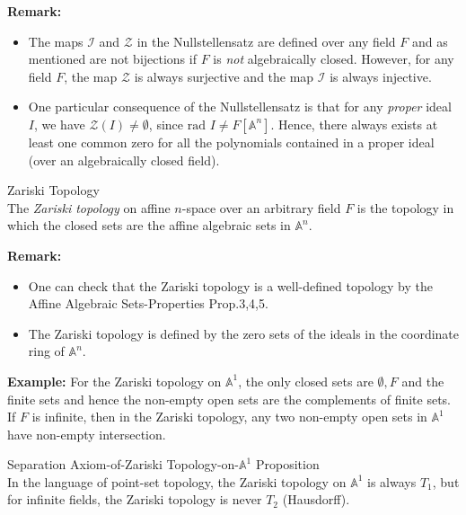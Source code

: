 \noindent\textbf{Remark:} \begin{itemize}
    \item The maps $\mathcal{I}$ and $\mathcal{Z}$ in the Nullstellensatz are defined over any field $F$ and as mentioned are not bijections if $F$ is \textit{not} algebraically closed. However, for any field $F$, the map $\mathcal{Z}$ is always surjective and the map $\mathcal{I}$ is always injective.

    \item One particular consequence of the Nullstellensatz is that for any \textit{proper} ideal $I$, we have $\mathcal{Z}(I) \neq \emptyset$, since $\text{rad }I \neq F[\mathbb{A}^n]$. Hence, there always exists at least one common zero for all the polynomials contained in a proper ideal (over an algebraically closed field).
\end{itemize}

\begin{definition}{Zariski Topology}\\
The \textit{Zariski topology} on affine $n$-space over an arbitrary field $F$ is the topology in which the closed sets are the affine algebraic sets in $\mathbb{A}^n$.
\end{definition}

\noindent\textbf{Remark:} \begin{itemize}
    \item One can check that the Zariski topology is a well-defined topology by the Affine Algebraic Sets-Properties Prop.3,4,5.
    \item The Zariski topology is defined by the zero sets of the ideals in the coordinate ring of $\mathbb{A}^n$.
\end{itemize}

\noindent\textbf{Example:} For the Zariski topology on $\mathbb{A}^1$, the only closed sets are $\emptyset,F$ and the finite sets and hence the non-empty open sets are the complements of finite sets. If $F$ is infinite, then in the Zariski topology, any two non-empty open sets in $\mathbb{A}^1$ have non-empty intersection.

\begin{proposition}{Separation Axiom-of-Zariski Topology-on-$\mathbb{A}^1$ Proposition}\\
In the language of point-set topology, the Zariski topology on $\mathbb{A}^1$ is always $T_1$, but for infinite fields, the Zariski topology is never $T_2$ (Hausdorff).
\end{proposition}

